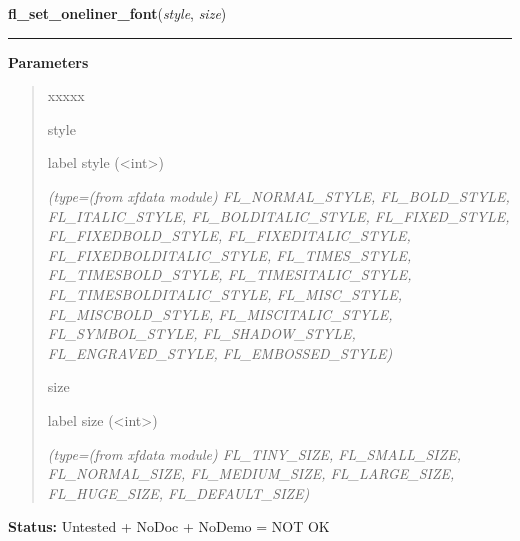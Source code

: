 \hspace{.8\funcindent}\begin{boxedminipage}{\funcwidth}

    \raggedright \textbf{fl\_set\_oneliner\_font}(\textit{style}, \textit{size})

    \vspace{-1.5ex}

    \rule{\textwidth}{0.5\fboxrule}
\setlength{\parskip}{2ex}
\setlength{\parskip}{1ex}
      \textbf{Parameters}
      \vspace{-1ex}

      \begin{quote}
        \begin{Ventry}{xxxxx}

          \item[style]

          label style ({\textless}int{\textgreater})

            {\it (type=(from xfdata module) FL\_NORMAL\_STYLE, FL\_BOLD\_STYLE, FL\_ITALIC\_STYLE,
FL\_BOLDITALIC\_STYLE, FL\_FIXED\_STYLE, FL\_FIXEDBOLD\_STYLE, 
FL\_FIXEDITALIC\_STYLE, FL\_FIXEDBOLDITALIC\_STYLE, FL\_TIMES\_STYLE, 
FL\_TIMESBOLD\_STYLE, FL\_TIMESITALIC\_STYLE, FL\_TIMESBOLDITALIC\_STYLE, 
FL\_MISC\_STYLE, FL\_MISCBOLD\_STYLE, FL\_MISCITALIC\_STYLE, 
FL\_SYMBOL\_STYLE, FL\_SHADOW\_STYLE, FL\_ENGRAVED\_STYLE, 
FL\_EMBOSSED\_STYLE)}

          \item[size]

          label size ({\textless}int{\textgreater})

            {\it (type=(from xfdata module) FL\_TINY\_SIZE, FL\_SMALL\_SIZE, FL\_NORMAL\_SIZE, 
FL\_MEDIUM\_SIZE, FL\_LARGE\_SIZE, FL\_HUGE\_SIZE, FL\_DEFAULT\_SIZE)}

        \end{Ventry}

      \end{quote}

\textbf{Status:} Untested + NoDoc + NoDemo = NOT OK



    \end{boxedminipage}

    \label{xformslib:flgoodies:fl_set_oneliner_color}

    \vspace{0.5ex}

